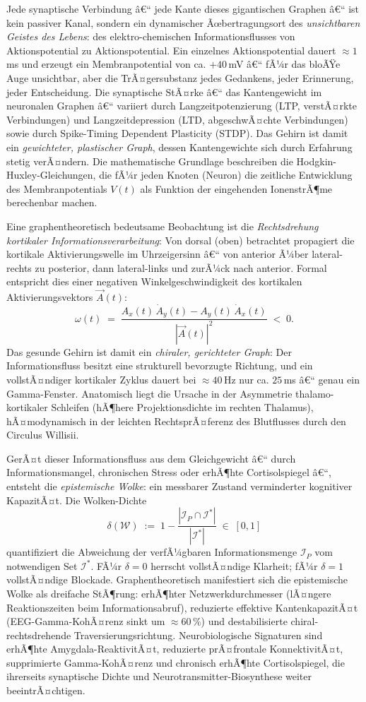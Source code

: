 ﻿\documentclass[a4paper,12pt]{article}
\theoremstyle{definition}
\begin{document}
	Jede synaptische Verbindung â€“ jede Kante dieses gigantischen Graphen â€“ ist kein passiver Kanal, sondern ein dynamischer Ãœbertragungsort des \emph{unsichtbaren Geistes des Lebens}: des elektro-chemischen Informationsflusses von Aktionspotential zu Aktionspotential. Ein einzelnes Aktionspotential dauert $\approx 1$\,ms und erzeugt ein Membranpotential von ca. $+40$\,mV â€“ fÃ¼r das bloÃŸe Auge unsichtbar, aber die TrÃ¤gersubstanz jedes Gedankens, jeder Erinnerung, jeder Entscheidung. Die synaptische StÃ¤rke â€“ das Kantengewicht im neuronalen Graphen â€“ variiert durch Langzeitpotenzierung (LTP, verstÃ¤rkte Verbindungen) und Langzeitdepression (LTD, abgeschwÃ¤chte Verbindungen) sowie durch Spike-Timing Dependent Plasticity (STDP). Das Gehirn ist damit ein \emph{gewichteter, plastischer Graph}, dessen Kantengewichte sich durch Erfahrung stetig verÃ¤ndern. Die mathematische Grundlage beschreiben die Hodgkin-Huxley-Gleichungen, die fÃ¼r jeden Knoten (Neuron) die zeitliche Entwicklung des Membranpotentials $V(t)$ als Funktion der eingehenden IonenstrÃ¶me berechenbar machen.

	Eine graphentheoretisch bedeutsame Beobachtung ist die \emph{Rechtsdrehung kortikaler Informationsverarbeitung}: Von dorsal (oben) betrachtet propagiert die kortikale Aktivierungswelle im Uhrzeigersinn â€“ von anterior Ã¼ber lateral-rechts zu posterior, dann lateral-links und zurÃ¼ck nach anterior. Formal entspricht dies einer negativen Winkelgeschwindigkeit des kortikalen Aktivierungsvektors $\vec{A}(t)$:
	\[
	\omega(t) \;=\; \frac{A_x(t)\,\dot{A}_y(t) - A_y(t)\,\dot{A}_x(t)}{|\vec{A}(t)|^2} \;<\; 0.
	\]
	Das gesunde Gehirn ist damit ein \emph{chiraler, gerichteter Graph}: Der Informationsfluss besitzt eine strukturell bevorzugte Richtung, und ein vollstÃ¤ndiger kortikaler Zyklus dauert bei $\approx 40$\,Hz nur ca. $25$\,ms â€“ genau ein Gamma-Fenster. Anatomisch liegt die Ursache in der Asymmetrie thalamo-kortikaler Schleifen (hÃ¶here Projektionsdichte im rechten Thalamus), hÃ¤modynamisch in der leichten RechtsprÃ¤ferenz des Blutflusses durch den Circulus Willisii.

	GerÃ¤t dieser Informationsfluss aus dem Gleichgewicht â€“ durch Informationsmangel, chronischen Stress oder erhÃ¶hte Cortisolspiegel â€“, entsteht die \emph{epistemische Wolke}: ein messbarer Zustand verminderter kognitiver KapazitÃ¤t. Die Wolken-Dichte
	\[
	\delta(\mathcal{W}) \;:=\; 1 - \frac{|\mathcal{I}_P \cap \mathcal{I}^*|}{|\mathcal{I}^*|} \;\in\; [0,1]
	\]
	quantifiziert die Abweichung der verfÃ¼gbaren Informationsmenge $\mathcal{I}_P$ vom notwendigen Set $\mathcal{I}^*$. FÃ¼r $\delta = 0$ herrscht vollstÃ¤ndige Klarheit; fÃ¼r $\delta = 1$ vollstÃ¤ndige Blockade. Graphentheoretisch manifestiert sich die epistemische Wolke als dreifache StÃ¶rung: erhÃ¶hter Netzwerkdurchmesser (lÃ¤ngere Reaktionszeiten beim Informationsabruf), reduzierte effektive KantenkapazitÃ¤t (EEG-Gamma-KohÃ¤renz sinkt um $\approx 60\,\%$) und destabilisierte chiral-rechtsdrehende Traversierungsrichtung. Neurobiologische Signaturen sind erhÃ¶hte Amygdala-ReaktivitÃ¤t, reduzierte prÃ¤frontale KonnektivitÃ¤t, supprimierte Gamma-KohÃ¤renz und chronisch erhÃ¶hte Cortisolspiegel, die ihrerseits synaptische Dichte und Neurotransmitter-Biosynthese weiter beeintrÃ¤chtigen.
\end{document}
